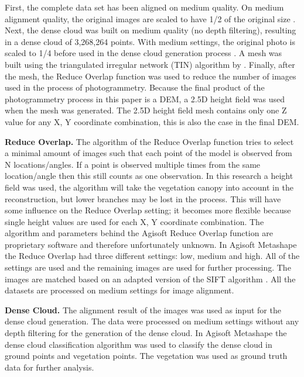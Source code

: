 \documentclass{isprs} %
\begin{document}
First, the complete data set has been aligned on medium quality.
On medium alignment quality, the original images are scaled to have 1/2 of the original size \citep{manual}.
Next, the dense cloud was built on medium quality (no depth filtering), resulting in a dense cloud of 3,268,264 points.
With medium settings, the original photo is scaled to 1/4 before used in the dense cloud generation process \citep{manual}.
A mesh was built using the triangulated irregular network (TIN) algorithm by \citet{axelsson1999processing}. 
Finally, after the mesh, the Reduce Overlap function was used to reduce the number of images used in the process of photogrammetry. 
Because the final product of the photogrammetry process in this paper is a DEM, a 2.5D height field was used when the mesh was generated.
The 2.5D height field mesh contains only one Z value for any X, Y coordinate combination, this is also the case in the final DEM.

\textbf{Reduce Overlap.} 
The algorithm of the Reduce Overlap function tries to select a minimal amount of images such that each point of the model is observed from N locations/angles.
If a point is observed multiple times from the same location/angle then this still counts as one observation. 
In this research a height field was used, the algorithm will take the vegetation canopy into account in the reconstruction, but lower branches may be lost in the process.
This will have some influence on the Reduce Overlap setting; it becomes more flexible because single height values are used for each X, Y coordinate combination.
The algorithm and parameters behind the Agisoft Reduce Overlap function are proprietary software and therefore unfortunately unknown.
In Agisoft Metashape the Reduce Overlap had three different settings: low, medium and high. 
All of the settings are used and the remaining images are used for further processing.
The images are matched based on an adapted version of the SIFT algorithm \citep{lowe1999object, AgisoftMetashape}.
All the datasets are processed on medium settings for image alignment.

\textbf{Dense Cloud.}
The alignment result of the images was used as input for the dense cloud generation.
The data were processed on medium settings without any depth filtering for the generation of the dense cloud. 
In Agisoft Metashape the dense cloud classification algorithm was used to classify the dense cloud in ground points and vegetation points. 
The vegetation was used as ground truth data for further analysis.
\end{document}
